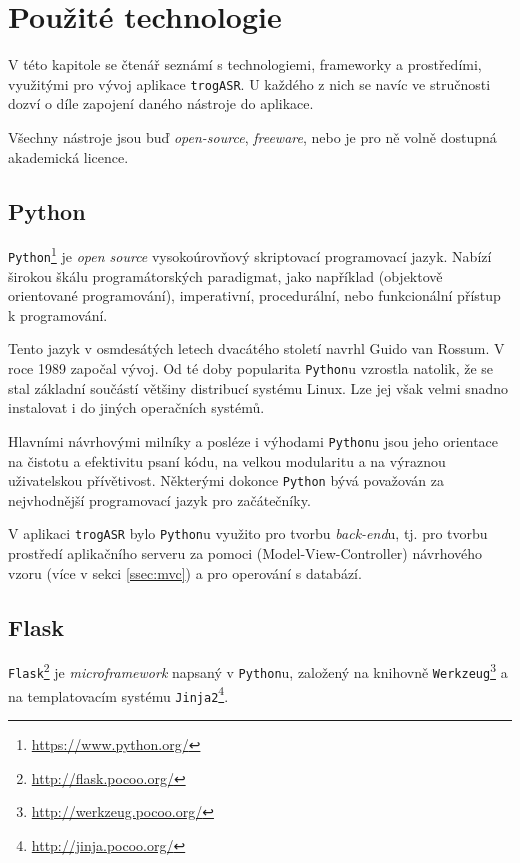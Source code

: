 \chapter{Použité technologie}

V této kapitole se čtenář seznámí s technologiemi, frameworky a prostředími, využitými pro vývoj aplikace \verb|trogASR|. U každého z nich se navíc ve stručnosti dozví o díle zapojení daného nástroje do aplikace.

Všechny nástroje jsou buď {\sl open-source}, {\sl freeware}, nebo je pro ně volně dostupná akademická licence.

\section{Python}

\verb|Python|\footnote{\url{https://www.python.org/}} je {\sl open source} vysokoúrovňový skriptovací programovací jazyk. Nabízí širokou škálu programátorských paradigmat, jako například  (objektově orientované programování), imperativní, procedurální, nebo funkcionální přístup k programování.

Tento jazyk v osmdesátých letech dvacátého století navrhl Guido van Rossum. V roce 1989 započal vývoj. Od té doby popularita \verb|Python|u vzrostla natolik, že se stal základní součástí většiny distribucí systému Linux. Lze jej však velmi snadno instalovat i do jiných operačních systémů.

Hlavními návrhovými milníky a posléze i výhodami \verb|Python|u jsou jeho orientace na čistotu a efektivitu psaní kódu, na velkou modularitu a na výraznou uživatelskou přívětivost. Některými dokonce \verb|Python| bývá považován za nejvhodnější programovací jazyk pro začátečníky.

V aplikaci \verb|trogASR| bylo \verb|Python|u využito pro tvorbu {\sl back-end}u, tj. pro tvorbu prostředí aplikačního serveru za pomoci  (Model-View-Controller) návrhového vzoru (více v sekci \ref{ssec:mvc}) a pro operování s databází.

\section{Flask}

\verb|Flask|\footnote{\url{http://flask.pocoo.org/}} je {\sl microframework} napsaný v \verb|Python|u, založený na knihovně \verb|Werkzeug|\footnote{\url{http://werkzeug.pocoo.org/}} a na templatovacím systému \verb|Jinja2|\footnote{\url{http://jinja.pocoo.org/}}.

